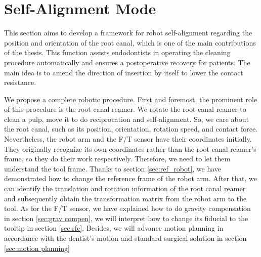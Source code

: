 \section{Self-Alignment Mode}
\hspace*{6mm}This section aims to develop a framework for robot self-alignment regarding the position and orientation of the root canal, which is one of the main contributions of the thesis. This function assists endodontists in operating the cleaning procedure automatically and ensures a postoperative recovery for patients. The main idea is to amend the direction of insertion by itself to lower the contact resistance.
\par
We propose a complete robotic procedure. First and foremost, the prominent role of this procedure is the root canal reamer. We rotate the root canal reamer to clean a pulp, move it to do reciprocation and self-alignment. So, we care about the root canal, such as its position, orientation, rotation speed, and contact force. Nevertheless, the robot arm and the F/T sensor have their coordinates initially. They originally recognize its own coordinates rather than the root canal reamer's frame, so they do their work respectively. Therefore, we need to let them understand the tool frame. Thanks to section \ref{sec:ref_robot}, we have demonstrated how to change the reference frame of the robot arm. After that, we can identify the translation and rotation information of the root canal reamer and subsequently obtain the transformation matrix from the robot arm to the tool. As for the F/T sensor, we have explained how to do gravity compensation in section \ref{sec:grav compen}, we will interpret how to change its fiducial to the tooltip in section \ref{sec:rfc}. Besides, we will advance motion planning in accordance with the dentist's motion and standard surgical solution in section \ref{sec:motion planning} 

